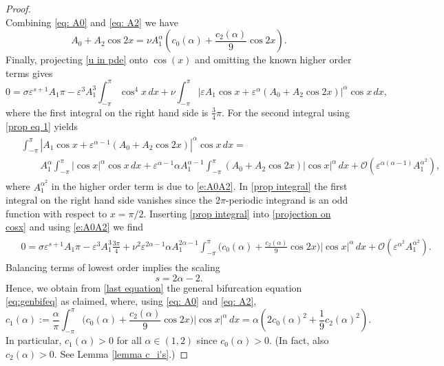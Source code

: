 \documentclass{article}
\numberwithin{equation}{section}
\def\calO{\mathcal{O}}
\begin{document}
\begin{proof}
\begin{equation}
		\end{equation}
		Combining \eqref{eq: A0} and \eqref{eq: A2} we have
		\begin{equation}\label{e:A0A2}
		A_0 +A_2 \cos 2x = \nu A_1^\alpha \left(c_0(\alpha) + \frac{c_2(\alpha)}{9}\cos 2x\right).
		\end{equation}
Finally, projecting \eqref{u in pde} onto $\cos(x)$ and omitting the known higher order terms gives
		\begin{equation} \label{projection on cosx}
			0 = \sigma \varepsilon^{s+1} A_1 \pi - \varepsilon^3  A_1^3 \int_{-\pi}^{\pi}  \cos ^4x \,dx + \nu \int_{-\pi}^{\pi} |\varepsilon A_1 \cos x + \varepsilon^{\alpha} (A_0 + A_2 \cos 2x)|^\alpha \cos x \,dx,
		\end{equation}
		where the first integral on the right hand side is $\frac 3 4 \pi$. For the second integral using \eqref{prop eq 1} 
		yields
		\begin{align}\label{prop integral}
			\begin{split}	
				&\int_{-\pi}^{\pi} |A_1 \cos x + \varepsilon^{\alpha-1} (A_0 + A_2 \cos 2x)|^\alpha \cos x \,dx = \\
				& \qquad A_1^\alpha \int_{-\pi}^{\pi} |\cos x|^\alpha \cos x \,dx 
				+ \varepsilon^{\alpha-1} \alpha A_1^{\alpha-1} \int_{-\pi}^{\pi}  (A_0 + A_2 \cos 2x) |\cos x|^{\alpha} \,dx 
+ \calO(\varepsilon^{\alpha(\alpha-1)}A_1^{\alpha^2}),
			\end{split}
		\end{align}
where $A_1^{\alpha^2}$ in the higher order term is  
due to \eqref{e:A0A2}. In \eqref{prop integral} the first integral on the right hand side vanishes since the $2\pi$-periodic integrand is an odd function with respect to $x=\pi/2$.  		
		Inserting \eqref{prop integral} into \eqref{projection on cosx} and using \eqref{e:A0A2} we find
		\begin{align}
			\begin{split}\label{last equation}
				&0 = \sigma \varepsilon^{s+1} A_1 \pi - \varepsilon^3 A_1^3 \frac{3\pi}{4} 
				+ \nu^2 \varepsilon^{2\alpha-1} \alpha A_1^{2\alpha -1} \int_{-\pi}^{\pi} \biggl(c_0(\alpha) + \frac{c_2(\alpha)}{9} \cos 2x \biggl) |\cos x|^\alpha \,dx + \calO(\varepsilon^{\alpha^2}A_1^{\alpha^2}). 
			\end{split}
		\end{align} 
		Balancing terms of lowest order implies the scaling 
		\begin{equation}
			s = 2\alpha -2.
		\end{equation}		
		Hence, we obtain from \eqref{last equation} the general bifurcation equation \eqref{eq:genbifeq} as claimed, 
		where, using \eqref{eq: A0} and \eqref{eq: A2}, 
		\begin{equation} \label{c_1}
			c_1(\alpha) := \frac{\alpha}{\pi} \int_{-\pi}^{\pi} \biggl( c_0(\alpha) + \frac{c_2(\alpha)}{9} \cos 2x \biggl) |\cos x|^\alpha \,dx 
			 =  \alpha \left(2 c_0(\alpha)^2 + \frac1 9 c_2(\alpha)^2 \right). 
		\end{equation}
In particular, $c_1(\alpha)>0$ for all $\alpha\in(1,2)$ since $c_0(\alpha)>0$. (In fact, also $c_2(\alpha)>0$. See Lemma \ref{lemma c_i's}.)  


\end{proof}
\end{document}
